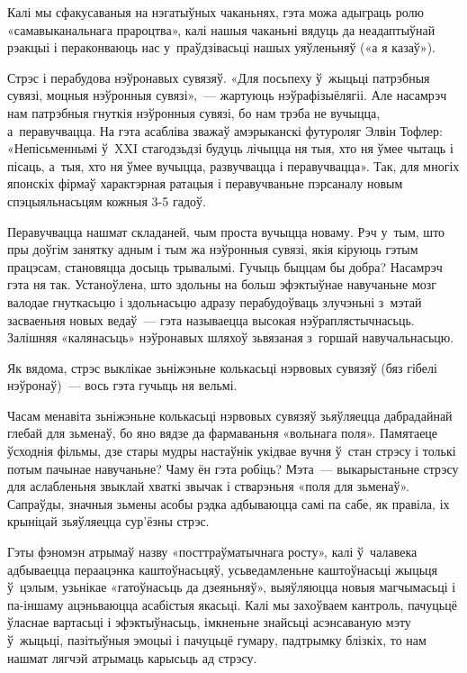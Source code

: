 Калі мы сфакусаваныя на нэгатыўных чаканьнях, гэта можа адыграць ролю «самавыканальнага прароцтва», калі нашыя чаканьні вядуць да неадаптыўнай рэакцыі і пераконваюць нас у~праўдзівасьці нашых уяўленьняў («а я казаў»).

Стрэс і перабудова нэўронавых сувязяў. «Для посьпеху ў~жыцьці патрэбныя сувязі, моцныя нэўронныя сувязі»,~--- жартуюць нэўрафізыёлягіі. Але насамрэч нам патрэбныя гнуткія нэўронныя сувязі, бо нам трэба не вучыцца, а~перавучвацца. На гэта асабліва зважаў амэрыканскі футуроляг Элвін Тофлер: «Непісьменнымі ў~XXI стагодзьдзі будуць лічыцца ня тыя, хто ня ўмее чытаць і пісаць, а~тыя, хто ня ўмее вучыцца, развучвацца і перавучвацца». Так, для многіх японскіх фірмаў характэрная ратацыя і перавучваньне пэрсаналу новым спэцыяльнасьцям кожныя 3-5 гадоў.

Перавучвацца нашмат складаней, чым проста вучыцца новаму. Рэч у~тым, што пры доўгім занятку адным і тым жа нэўронныя сувязі, якія кіруюць гэтым працэсам, становяцца досыць трывалымі. Гучыць быццам бы добра? Насамрэч гэта ня так. Устаноўлена, што здольны на больш эфэктыўнае навучаньне мозг валодае гнуткасьцю і здольнасьцю адразу перабудоўваць злучэньні з~мэтай засваеньня новых ведаў~--- гэта называецца высокая нэўраплястычнасьць. Залішняя «калянасьць» нэўронавых шляхоў зьвязаная з~горшай навучальнасьцю.

Як вядома, стрэс выклікае зьніжэньне колькасьці нэрвовых сувязяў (бяз гібелі нэўронаў)~--- вось гэта гучыць ня вельмі.

Часам менавіта зьніжэньне колькасьці нэрвовых сувязяў зьяўляецца дабрадайнай глебай для зьменаў, бо яно вядзе да фармаваньня «вольнага поля». Памятаеце ўсходнія фільмы, дзе стары мудры настаўнік укідвае вучня ў~стан стрэсу і толькі потым пачынае навучаньне? Чаму ён гэта робіць? Мэта~--- выкарыстаньне стрэсу для аслабленьня звыклай хваткі звычак і стварэньня «поля для зьменаў». Сапраўды, значныя зьмены асобы рэдка адбываюцца самі па сабе, як правіла, іх крыніцай зьяўляецца сур'ёзны стрэс.

Гэты фэномэн атрымаў назву «посттраўматычнага росту», калі ў~чалавека адбываецца пераацэнка каштоўнасьцяў, усьведамленьне каштоўнасьці жыцьця ў~цэлым, узьнікае «гатоўнасьць да дзеяньняў», выяўляюцца новыя магчымасьці і па-іншаму ацэньваюцца асабістыя якасьці. Калі мы захоўваем кантроль, пачуцьцё ўласнае вартасьці і эфэктыўнасьць, імкненьне знайсьці асэнсаваную мэту ў~жыцьці, пазітыўныя эмоцыі і пачуцьцё гумару, падтрымку блізкіх, то нам нашмат лягчэй атрымаць карысьць ад стрэсу.

